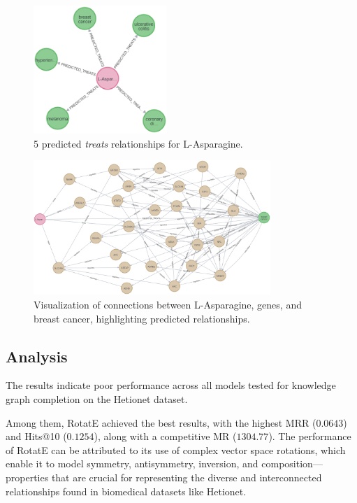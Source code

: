 \begin{figure}[ht]
    \centering
    \includegraphics[width=0.45\textwidth]{images/pykeen/predicted treats}
    \caption{5 predicted \textit{treats} relationships for L-Asparagine.}
    \label{fig:predicted_treats}
\end{figure}

\begin{figure}[ht]
    \centering
    \includegraphics[width=0.8\textwidth]{images/pykeen/results}
    \caption{Visualization of connections between L-Asparagine, genes, and breast cancer, highlighting predicted relationships.}
    \label{fig:kg_visualization}
\end{figure}

\subsection*{Analysis}

The results indicate poor performance across all models tested for knowledge graph completion on the Hetionet dataset.


Among them, RotatE achieved the best results, with the highest MRR ($0.0643$) and Hits@10 ($0.1254$), along with a competitive MR ($1304.77$). The performance of RotatE can be attributed to its use of complex vector space rotations, which enable it to model symmetry, antisymmetry, inversion, and composition—properties that are crucial for representing the diverse and interconnected relationships found in biomedical datasets like Hetionet.

